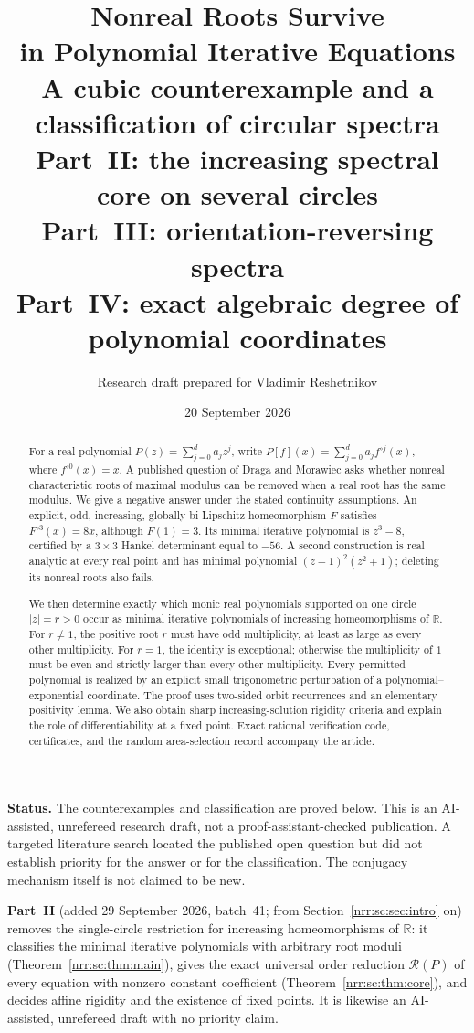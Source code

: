 \documentclass[11pt,letterpaper]{article}
\title{\textbf{Nonreal Roots Survive\\in Polynomial Iterative Equations}\\[0.5em]
  \large A cubic counterexample and a classification of circular spectra\\[0.2em]
  \large Part~II: the increasing spectral core on several circles\\[0.2em]
  \large Part~III: orientation-reversing spectra\\[0.2em]
  \large Part~IV: exact algebraic degree of polynomial coordinates}
\author{Research draft prepared for Vladimir Reshetnikov}
\date{20 September 2026}
\theoremstyle{definition}
\theoremstyle{remark}
\newcommand{\R}{\mathbb R}
\newcommand{\itn}[2]{#1^{\circ #2}}
\newcommand{\core}{\mathcal R}
\begin{document}
\maketitle
\begin{abstract}
For a real polynomial $P(z)=\sum_{j=0}^d a_jz^j$, write
$P[f](x)=\sum_{j=0}^d a_j\itn{f}{j}(x)$, where $\itn{f}{0}(x)=x$.
A published question of Draga and Morawiec asks whether nonreal characteristic
roots of maximal modulus can be removed when a real root has the same modulus.
We give a negative answer under the stated continuity assumptions. An explicit,
odd, increasing, globally bi-Lipschitz homeomorphism $F$ satisfies
$\itn{F}{3}(x)=8x$, although $F(1)=3$. Its minimal iterative polynomial is
$z^3-8$, certified by a $3\times3$ Hankel determinant equal to $-56$.
A second construction is real analytic at every real point and has minimal
polynomial $(z-1)^2(z^2+1)$; deleting its nonreal roots also fails.

We then determine exactly which monic real polynomials supported on one circle
$|z|=r>0$ occur as minimal iterative polynomials of increasing homeomorphisms of
$\R$. For $r\ne1$, the positive root $r$ must have odd multiplicity, at least
as large as every other multiplicity. For $r=1$, the identity is exceptional;
otherwise the multiplicity of $1$ must be even and strictly larger than every
other multiplicity. Every permitted polynomial is realized by an explicit
small trigonometric perturbation of a polynomial--exponential coordinate.
The proof uses two-sided orbit recurrences and an elementary positivity lemma.
We also obtain sharp increasing-solution rigidity criteria and explain the
role of differentiability at a fixed point. Exact rational verification code,
certificates, and the random area-selection record accompany the article.
\end{abstract}

\enlargethispage{\baselineskip}
\begingroup\small
\noindent\textbf{Status.} The counterexamples and classification are proved below.
This is an AI-assisted, unrefereed research draft, not a proof-assistant-checked
publication. A targeted literature search located the published open question
but did not establish priority for the answer or for the classification.
The conjugacy mechanism itself is not claimed to be new.

\noindent\textbf{Part~II} (added 29 September 2026, batch~41; from
Section~\ref{nrr:sc:sec:intro} on) removes the single-circle restriction for
increasing homeomorphisms of $\R$: it classifies the minimal iterative
polynomials with arbitrary root moduli (Theorem~\ref{nrr:sc:thm:main}), gives
the exact universal order reduction $\core(P)$ of every equation with nonzero
constant coefficient (Theorem~\ref{nrr:sc:thm:core}), and decides affine
rigidity and the existence of fixed points. It is likewise an AI-assisted,
unrefereed draft with no priority claim.
\end{document}
